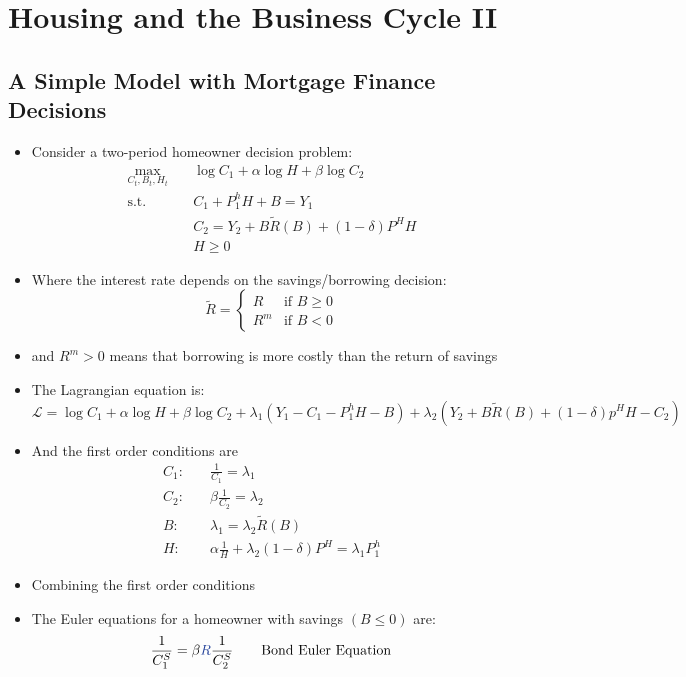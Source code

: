 \documentclass[a4paper,twoside]{article}
\newif\IfInSansMode
\numberwithin{equation}{section}
\numberwithin{figure}{section}
\begin{document}
\section{Housing and the Business Cycle II}
\subsection{A Simple Model with Mortgage Finance Decisions}
	\begin{itemize}
		\item Consider a two-period homeowner decision problem:
		\begin{align*}
			\max_{C_t,B_t,H_t}\quad &\log C_1 + \alpha\log H + \beta\log C_2 \\
			\text{s.t.}\quad &C_1 + P_1^h H + B = Y_1\\
			&C_2 = Y_2 + B\tilde{R}(B) + (1-\delta) P^H H\\
			&H \geq 0
		\end{align*}
		\item Where the interest rate depends on the savings/borrowing decision:
		\[
			\tilde{R}=
			\begin{cases}
				R &\text{if } B\geq0 \\
				R^m &\text{if } B<0
			\end{cases}
		\]
		\item and \( R^m > 0 \) means that borrowing is more costly than the return of savings
		\item The Lagrangian equation is:
		\[
			\mathcal{L} = \log C_1 + \alpha\log H + \beta\log C_2 + \lambda_1(Y_1 - C_1 - P_1^h H-B) + \lambda_2(Y_2 + B\tilde{R}(B) + (1-\delta)p^H H-C_2)
		\]
		\item And the first order conditions are
		\begin{align*}
			C_1:& \quad\frac{1}{C_1}=\lambda_1\\
			C_2:& \quad\beta\frac{1}{C_2}=\lambda_2\\
			B:& \quad\lambda_1=\lambda_2\tilde{R}(B)\\
			H:& \quad\alpha\frac{1}{H}+\lambda_2(1-\delta)P^H = \lambda_1P_1^h
		\end{align*}
		\item Combining the first order conditions
		\item The Euler equations for a homeowner with \textcolor{myblue}{savings} \( (B\leq0) \) are:
		\begin{alignat*}{2}
			\frac{1}{C_1^S} &= \beta\textcolor{myblue}{R}\frac{1}{C_2^S}\quad &&\text{Bond Euler Equation}\\

\end{alignat*}
\end{itemize}
\end{document}
